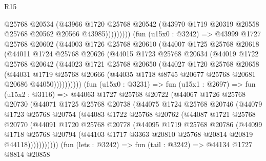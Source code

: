 \begin{lexlean}{R15}
\begin{coremodule}
                      @25768
                      @20534
                      (@43966
                        @1720
                        @25768
                        @20542
                        (@43970 @1719 @20319 @20558 @25768 @20562 @20566 @43985)))))))))
        (fun (u15x0 : @3242) =>
        @43999
          @1727
          @25768
          @20602
          (@44003
            @1726
            @25768
            @20610
            (@44007
              @1725
              @25768
              @20618
              (@44011
                @1724
                @25768
                @20626
                (@44015
                  @1723
                  @25768
                  @20634
                  (@44019
                    @1722
                    @25768
                    @20642
                    (@44023
                      @1721
                      @25768
                      @20650
                      (@44027
                        @1720
                        @25768
                        @20658
                        (@44031
                          @1719
                          @25768
                          @20666
                          (@44035 @1718 @8745 @20677 @25768 @20681 @20686 @44050))))))))))
        (fun (u15x0 : @3231) =>
        fun (u15x1 : @2697) =>
        fun (u15x2 : @3116) =>
        @44063
          @1727
          @25768
          @20722
          (@44067
            @1726
            @25768
            @20730
            (@44071
              @1725
              @25768
              @20738
              (@44075
                @1724
                @25768
                @20746
                (@44079
                  @1723
                  @25768
                  @20754
                  (@44083
                    @1722
                    @25768
                    @20762
                    (@44087
                      @1721
                      @25768
                      @20770
                      (@44091
                        @1720
                        @25768
                        @20778
                        (@44095
                          @1719
                          @25768
                          @20786
                          (@44099
                            @1718
                            @25768
                            @20794
                            (@44103 @1717 @3363 @20810 @25768 @20814 @20819 @44118)))))))))))
        (fun (lets : @3242) =>
        fun (tail : @3242) =>
        @44134
          @1727
          @8814
          @20858

\end{coremodule}
\end{lexlean}
